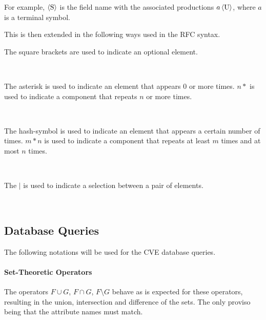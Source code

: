 \begin{bnf*}
\end{bnf*}

For example, $\langle \text S \rangle$ is the field name with the associated
productions $a \, \langle \text U \rangle$, where $a$ is a terminal symbol.

\begin{bnf*}
\end{bnf*}
This is then extended in the following ways used in the RFC syntax.

The square brackets are used to indicate an optional element.
\begin{bnf*}
\\
\end{bnf*}

The asterisk is used to indicate an element that appears 0 or more times. $n*$
is used to indicate a component that repeats $n$ or more times.

\begin{bnf*}
\\
\end{bnf*}

The hash-symbol is used to indicate an element that appears a certain number of
times. $m*n$ is used to indicate a component that repeats at least $m$ times and
at most $n$ times.

\begin{bnf*}
\\
\end{bnf*}

The $|$ is used to indicate a selection between a pair of elements.
\begin{bnf*}
\\
\end{bnf*}

\subsection{Database Queries}
The following notations will be used for the CVE database queries.

\paragraph{Set-Theoretic Operators}
The operators $F\cup G$, $F \cap G$, $F\setminus G$ behave as is expected for
these operators, resulting in the union, intersection and difference of the
sets.  The only proviso being that the attribute names must match.

